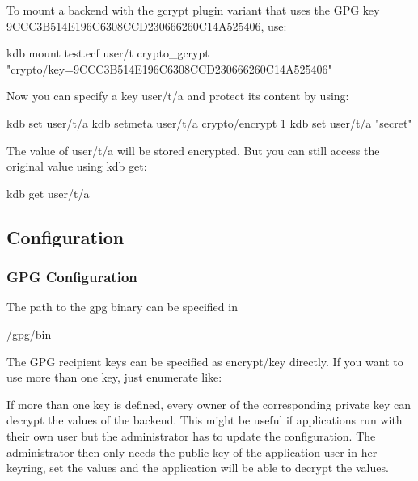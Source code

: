 To mount a backend with the gcrypt plugin variant that uses the G\+PG key 9\+C\+C\+C3\+B514\+E196\+C6308\+C\+C\+D230666260\+C14\+A525406, use\+:


\begin{DoxyCode}
kdb mount test.ecf user/t crypto\_gcrypt "crypto/key=9CCC3B514E196C6308CCD230666260C14A525406"
\end{DoxyCode}


Now you can specify a key {\ttfamily user/t/a} and protect its content by using\+:


\begin{DoxyCode}
kdb set user/t/a
kdb setmeta user/t/a crypto/encrypt 1
kdb set user/t/a "secret"
\end{DoxyCode}


The value of {\ttfamily user/t/a} will be stored encrypted. But you can still access the original value using {\ttfamily kdb get}\+:


\begin{DoxyCode}
kdb get user/t/a
\end{DoxyCode}


\subsection*{Configuration}

\subsubsection*{G\+PG Configuration}

The path to the gpg binary can be specified in


\begin{DoxyCode}
/gpg/bin
\end{DoxyCode}


The G\+PG recipient keys can be specified as {\ttfamily encrypt/key} directly. If you want to use more than one key, just enumerate like\+:




If more than one key is defined, every owner of the corresponding private key can decrypt the values of the backend. This might be useful if applications run with their own user but the administrator has to update the configuration. The administrator then only needs the public key of the application user in her keyring, set the values and the application will be able to decrypt the values.


